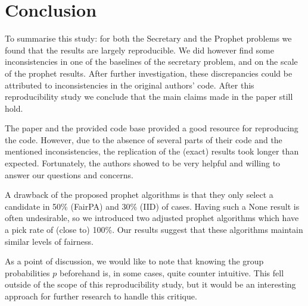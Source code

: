 \section{Conclusion}

To summarise this study: for both the Secretary and the Prophet problems we found that the results are largely reproducible. We did however find some inconsistencies in one of the baselines of the secretary problem, and on the scale of the prophet results.
After further investigation, these discrepancies could be attributed to inconsistencies in the original authors' code. After this reproducibility study we conclude that the main claims made in the paper still hold.

The paper and the provided code base provided a good resource for reproducing the code. However, due to the absence of several parts of their code and the mentioned inconsistencies, the replication of the (exact) results took longer than expected. Fortunately, the authors showed to be very helpful and willing to answer our questions and concerns.

A drawback of the proposed prophet algorithms is that they only select a candidate in 50\% (FairPA) and 30\% (IID) of cases. Having such a None result is often undesirable, so we introduced two adjusted prophet algorithms which have a pick rate of (close to) 100\%. Our results suggest that these algorithms maintain similar levels of fairness.

As a point of discussion, we would like to note that knowing the group probabilities $p$ beforehand is, in some cases, quite counter intuitive. This fell outside of the scope of this reproducibility study, but it would be an interesting approach for further research to handle this critique.

